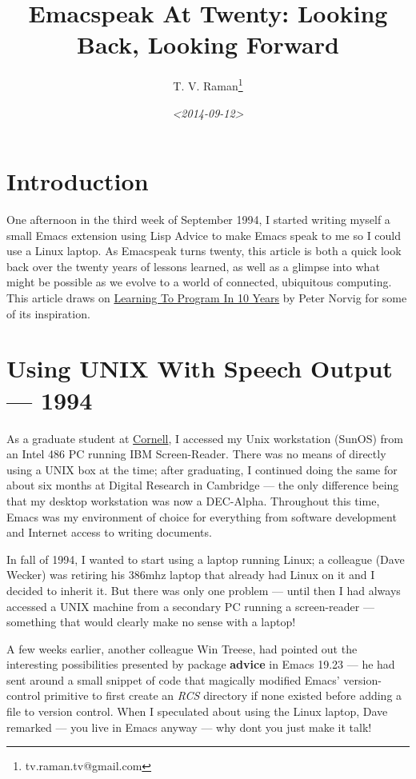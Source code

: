 \documentclass[11pt]{article}
\author{T. V. Raman\thanks{tv.raman.tv@gmail.com}}
\date{\textit{<2014-09-12>}}
\title{Emacspeak At Twenty: Looking Back, Looking Forward}
\begin{document}
\maketitle
\tableofcontents

\section{Introduction}
\label{sec-1}

One afternoon in the third week of September 1994, I started
writing myself a small Emacs extension using Lisp Advice to make
Emacs speak to me so I could use a Linux laptop. As Emacspeak
turns twenty, this article is both a quick look back over the
twenty years of lessons learned, as well as a glimpse into what
might be possible as we evolve to a world of connected,
ubiquitous computing. This article draws on \href{http://norvig.com/21-days.html}{Learning To Program
In 10 Years} by Peter Norvig for some of its inspiration.

\section{Using UNIX With Speech Output —  1994}
\label{sec-2}

As a graduate student at \href{http://www.cs.cornell.edu/info/people/raman/raman.html}{Cornell}, I accessed my Unix workstation
(SunOS) from an Intel 486 PC running IBM Screen-Reader. There was
no means of directly using a UNIX box at the time; after
graduating, I continued doing the same for about six months at
Digital Research in Cambridge — the only difference being that my
desktop workstation was now a DEC-Alpha. Throughout this time,
Emacs was my environment of choice for everything from software
development and Internet access to writing documents.


In fall of 1994, I wanted to start using a laptop running Linux;
a colleague (Dave Wecker) was retiring his 386mhz laptop that
already had Linux on it and I decided to inherit it. But there
was only one problem — until then I had always accessed a UNIX
machine from a secondary PC running a screen-reader — something
that would clearly make no sense with a laptop!

A few weeks earlier, another colleague Win Treese, had pointed
out the interesting possibilities presented by package \textbf{advice}  in
Emacs 19.23 — he had sent around a small snippet of code that
magically modified Emacs' version-control primitive to first
create an \emph{RCS} directory if none existed before adding a file to
version control. When I speculated about using the Linux laptop,
Dave remarked — you live in Emacs anyway — why dont you just make
it talk!
\end{document}
